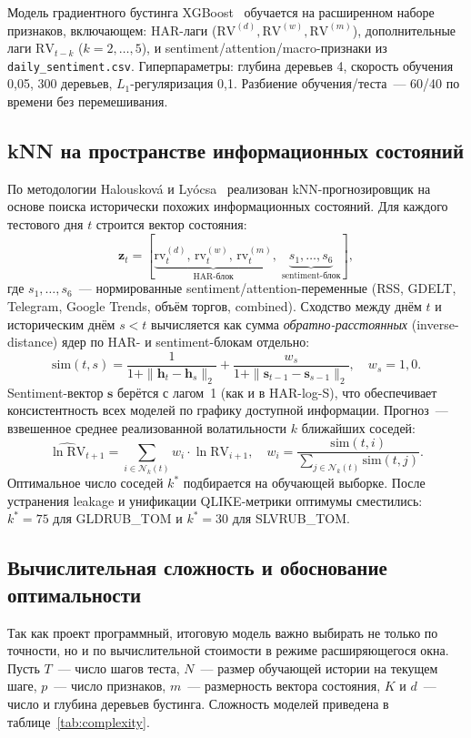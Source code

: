 Модель градиентного бустинга XGBoost~\cite{Chen2016}
обучается на расширенном наборе признаков, включающем:
HAR-лаги ($\mathrm{RV}^{(d)}, \mathrm{RV}^{(w)}, \mathrm{RV}^{(m)}$),
дополнительные лаги $\mathrm{RV}_{t-k}$ ($k=2,\ldots,5$),
и sentiment/attention/macro-признаки из \texttt{daily\_sentiment.csv}.
Гиперпараметры: глубина деревьев 4, скорость обучения 0{,}05,
300 деревьев, $L_1$-регуляризация 0{,}1.
Разбиение обучения/теста~--- 60/40 по времени без перемешивания.

\subsection{kNN на пространстве информационных состояний}

По методологии Halousková и Lyócsa~\cite{Halouskova2025}
реализован kNN-прогнозировщик на основе поиска исторически похожих
информационных состояний.
Для каждого тестового дня $t$ строится вектор состояния:
\[
  \mathbf{z}_t = [\underbrace{\mathrm{rv}^{(d)}_t,\, \mathrm{rv}^{(w)}_t,\, \mathrm{rv}^{(m)}_t}_{\text{HAR-блок}},\;
                  \underbrace{s_1,\ldots,s_6}_{\text{sentiment-блок}}],
\]
где $s_1,\ldots,s_6$~--- нормированные sentiment/attention-переменные
(RSS, GDELT, Telegram, Google Trends, объём торгов, combined).
Сходство между днём $t$ и историческим днём $s < t$ вычисляется
как сумма \textit{обратно-расстоянных} (inverse-distance) ядер
по HAR- и sentiment-блокам отдельно:
\[
  \mathrm{sim}(t, s) =
    \frac{1}{1 + \|\mathbf{h}_t - \mathbf{h}_s\|_2} +
    \frac{w_s}{1 + \|\mathbf{s}_{t-1} - \mathbf{s}_{s-1}\|_2},
    \quad w_s = 1{,}0.
\]
Sentiment-вектор $\mathbf{s}$ берётся с лагом~1 (как и в HAR-log-S),
что обеспечивает консистентность всех моделей по графику доступной
информации.
Прогноз~--- взвешенное среднее реализованной волатильности $k$ ближайших соседей:
\[
  \widehat{\ln \mathrm{RV}}_{t+1} = \sum_{i \in \mathcal{N}_k(t)} w_i \cdot \ln \mathrm{RV}_{i+1},
  \quad w_i = \frac{\mathrm{sim}(t,i)}{\sum_{j \in \mathcal{N}_k(t)} \mathrm{sim}(t,j)}.
\]
Оптимальное число соседей $k^*$ подбирается на обучающей выборке.
После устранения leakage и унификации QLIKE-метрики оптимумы
сместились: $k^* = 75$ для GLDRUB\_TOM и $k^* = 30$ для SLVRUB\_TOM.

\subsection{Вычислительная сложность и обоснование оптимальности}
\label{sec:complexity}

Так как проект программный, итоговую модель важно выбирать не только
по точности, но и по вычислительной стоимости в режиме расширяющегося окна.
Пусть $T$~--- число шагов теста, $N$~--- размер обучающей истории на текущем
шаге, $p$~--- число признаков, $m$~--- размерность вектора состояния,
$K$ и $d$~--- число и глубина деревьев бустинга. Сложность моделей приведена
в таблице~\ref{tab:complexity}.

